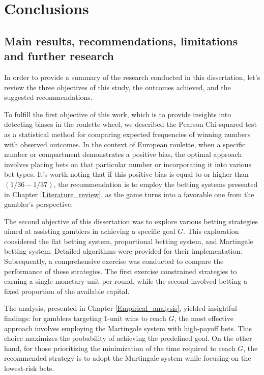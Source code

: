 \documentclass[11pt,twoside]{article}
\numberwithin{Theorem}{section}
\numberwithin{Definition}{section}
\numberwithin{Lemma}{section}
\numberwithin{Algorithm}{section}
\numberwithin{equation}{section}
\begin{document}
\section{Conclusions}\label{Conclusions}
\subsection{Main results, recommendations, limitations and further research}
In order to provide a summary of the research conducted in this dissertation, let's review the three objectives of this study, the outcomes achieved, and the suggested recommendations.

To fulfill the first objective of this work, which is to provide insights into detecting biases in the roulette wheel, we described the Pearson Chi-squared test as a statistical method for comparing expected frequencies of winning numbers with observed outcomes. In the context of European roulette, when a specific number or compartment demonstrates a positive bias, the optimal approach involves placing bets on that particular number or incorporating it into various bet types. It's worth noting that if this positive bias is equal to or higher than $(1/36 - 1/37)$, the recommendation is to employ the betting systems presented in Chapter \ref{Literature_review}, as the game turns into a favorable one from the gambler's perspective.

The second objective of this dissertation was to explore various betting strategies aimed at assisting gamblers in achieving a specific goal $G$. This exploration considered the flat betting system, proportional betting system, and Martingale betting system. Detailed algorithms were provided for their implementation. Subsequently, a comprehensive exercise was conducted to compare the performance of these strategies. The first exercise constrained strategies to earning a single monetary unit per round, while the second involved betting a fixed proportion of the available capital.

The analysis, presented in Chapter \ref{Empirical_analysis}, yielded insightful findings: for gamblers targeting 1-unit wins to reach $G$, the most effective approach involves employing the Martingale system with high-payoff bets. This choice maximizes the probability of achieving the predefined goal. On the other hand, for those prioritizing the minimization of the time required to reach $G$, the recommended strategy is to adopt the Martingale system while focusing on the lowest-risk bets.
\end{document}
